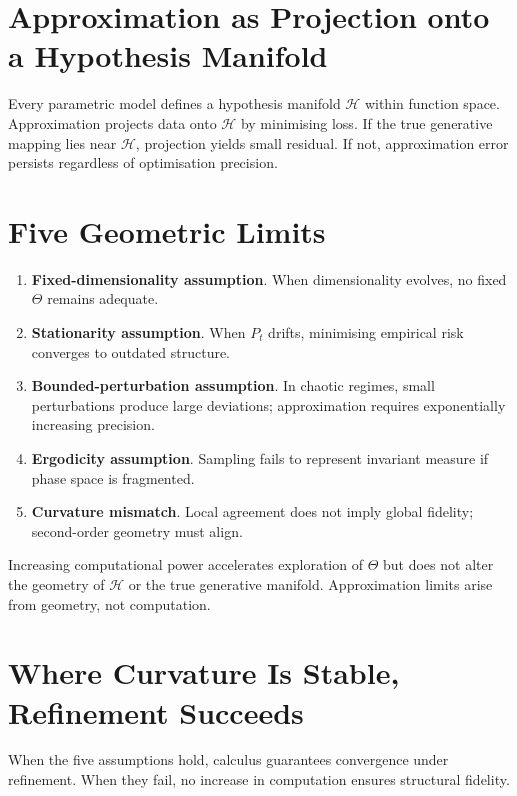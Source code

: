 \documentclass[12pt,openany]{book}
\begin{document}
\section{Approximation as Projection onto a Hypothesis Manifold}

Every parametric model defines a hypothesis manifold $\mathcal{H}$ within
function space. Approximation projects data onto $\mathcal{H}$ by minimising
loss. If the true generative mapping lies near $\mathcal{H}$, projection yields
small residual. If not, approximation error persists regardless of optimisation
precision.

\section{Five Geometric Limits}

\begin{enumerate}[leftmargin=1.5em]
  \item \textbf{Fixed-dimensionality assumption}. When dimensionality evolves,
    no fixed $\Theta$ remains adequate.
  \item \textbf{Stationarity assumption}. When $P_t$ drifts, minimising
    empirical risk converges to outdated structure.
  \item \textbf{Bounded-perturbation assumption}. In chaotic regimes, small
    perturbations produce large deviations; approximation requires
    exponentially increasing precision.
  \item \textbf{Ergodicity assumption}. Sampling fails to represent invariant
    measure if phase space is fragmented.
  \item \textbf{Curvature mismatch}. Local agreement does not imply global
    fidelity; second-order geometry must align.
\end{enumerate}

\begin{insight}
  Increasing computational power accelerates exploration of $\Theta$ but does
  not alter the geometry of $\mathcal{H}$ or the true generative manifold.
  Approximation limits arise from geometry, not computation.
\end{insight}

\section{Where Curvature Is Stable, Refinement Succeeds}

When the five assumptions hold, calculus guarantees convergence under
refinement. When they fail, no increase in computation ensures structural
fidelity.
\end{document}
